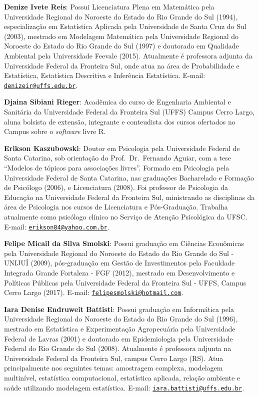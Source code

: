 \documentclass[12pt,brazil,oneside]{book}
\begin{document}
\textbf{Denize Ivete Reis}: Possui Licenciatura Plena em Matemática pela
Universidade Regional do Noroeste do Estado do Rio Grande do Sul (1994),
especialização em Estatística Aplicada pela Universidade de Santa Cruz
do Sul (2003), mestrado em Modelagem Matemática pela Universidade
Regional do Noroeste do Estado do Rio Grande do Sul (1997) e doutorado
em Qualidade Ambiental pela Universidade Feevale (2015). Atualmente é
professora adjunta da Universidade Federal da Fronteira Sul, onde atua
na área de Probabilidade e Estatística, Estatística Descritiva e
Inferência Estatística. E-mail:
\href{mailto:denizeir@uffs.edu.br}{\nolinkurl{denizeir@uffs.edu.br}}.

\textbf{Djaina Sibiani Rieger}: Acadêmica do curso de Engenharia
Ambiental e Sanitária da Universidade Federal da Fronteira Sul (UFFS)
Campus Cerro Largo, aluna bolsista de extensão, integrante e conteudista
dos cursos ofertados no Campus sobre o \emph{software} livre R.

\textbf{Erikson Kaszubowski}: Doutor em Psicologia pela Universidade
Federal de Santa Catarina, sob orientação do Prof.~Dr.~Fernando Aguiar,
com a tese ``Modelos de tópicos para associações livres''. Formado em
Psicologia pela Universidade Federal de Santa Catarina, nas graduações
Bacharelado e Formação de Psicólogo (2006), e Licenciatura (2008). Foi
professor de Psicologia da Educação na Universidade Federal da Fronteira
Sul, ministrando as disciplinas da área de Psicologia nos cursos de
Licenciatura e Pós-Graduação. Trabalha atualmente como psicólogo clínico
no Serviço de Atenção Psicológica da UFSC. E-mail:
\href{mailto:erikson84@yahoo.com.br}{\nolinkurl{erikson84@yahoo.com.br}}.

\textbf{Felipe Micail da Silva Smolski}: Possui graduação em Ciências
Econômicas pela Universidade Regional do Noroeste do Estado do Rio
Grande do Sul - UNIJUÍ (2009), pós-graduação em Gestão de Investimentos
pela Faculdade Integrada Grande Fortaleza - FGF (2012), mestrado em
Desenvolvimento e Políticas Públicas pela Universidade Federal da
Fronteira Sul - UFFS, Campus Cerro Largo (2017). E-mail:
\href{mailto:felipesmolski@hotmail.com}{\nolinkurl{felipesmolski@hotmail.com}}.

\textbf{Iara Denise Endruweit Battisti}: Possui graduação em Informática
pela Universidade Regional do Noroeste do Estado do Rio Grande do Sul
(1996), mestrado em Estatística e Experimentação Agropecuária pela
Universidade Federal de Lavras (2001) e doutorado em Epidemiologia pela
Universidade Federal do Rio Grande do Sul (2008). Atualmente é
professora adjunta na Universidade Federal da Fronteira Sul, campus
Cerro Largo (RS). Atua principalmente nos seguintes temas: amostragem
complexa, modelagem multinível, estatística computacional, estatística
aplicada, relação ambiente e saúde utilizando modelagem estatística.
E-mail:
\href{mailto:iara.battisti@uffs.edu.br}{\nolinkurl{iara.battisti@uffs.edu.br}}.
\end{document}
